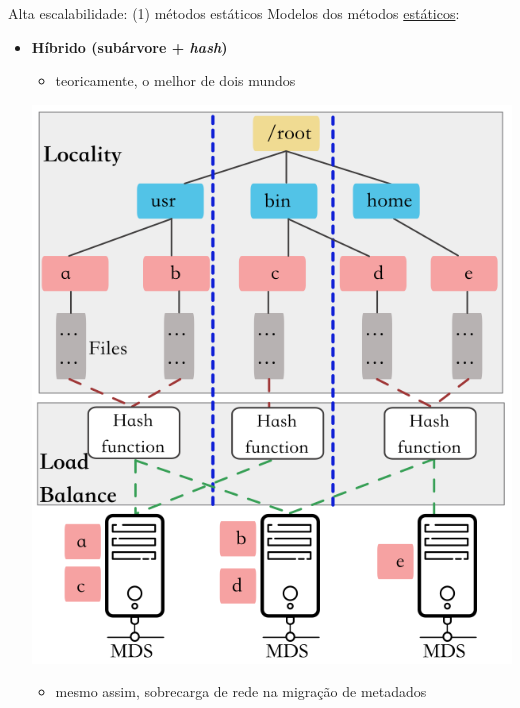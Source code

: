 \documentclass[xcolor=dvipsnames,table]{beamer}
\begin{document}
\begin{frame}{Alta escalabilidade: (1) métodos estáticos}
	Modelos dos métodos \underline{estáticos}:
	\begin{itemize}
		\item \textbf{Híbrido (subárvore + \textit{hash})}
		\begin{itemize}
			\item teoricamente, o melhor de dois mundos
		\end{itemize}
			\includegraphics[scale=0.2]{esc-est-hib.png}
		\begin{itemize}
			\item mesmo assim, sobrecarga de rede na migração de metadados
		\end{itemize}
	\end{itemize}
\end{frame}
\end{document}
